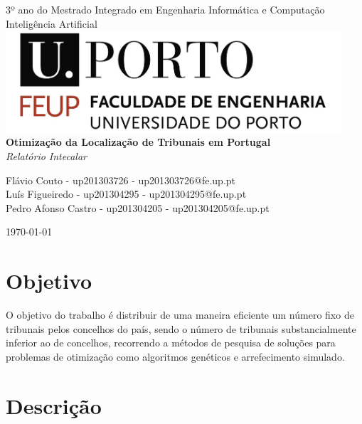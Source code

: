 \documentclass[11pt,a4paper,reqno]{article}
\numberwithin{equation}{section}
\begin{document}
\begin{titlepage}
\begin{center}

{\large 3º ano do Mestrado Integrado em Engenharia Informática e Computação \\[5mm]}
{\Large Inteligência Artificial}\\[3cm]

\includegraphics[width=12.5cm]{feup_logo.jpg}\\[3cm]

{\Huge \bfseries Otimização da Localização de Tribunais em Portugal \\[5mm]}
{\large \textit{Relatório Intecalar} \\[2cm]}


{\large Flávio Couto - up201303726 - up201303726@fe.up.pt\\[1mm]}
{\large Luís Figueiredo - up201304295 - up201304295@fe.up.pt \\[1mm]}
{\large Pedro Afonso Castro - up201304205 - up201304205@fe.up.pt\\[1cm]}


{\large \today}

\end{center}
\end{titlepage}

\tableofcontents

\section{Objetivo}

O objetivo do trabalho é distribuir de uma maneira eficiente um número fixo de tribunais pelos concelhos do país, sendo o número de tribunais substancialmente inferior ao de concelhos, recorrendo a métodos de pesquisa de soluções para problemas de otimização como algoritmos genéticos e arrefecimento simulado. 


\section{Descrição} 
\end{document}
